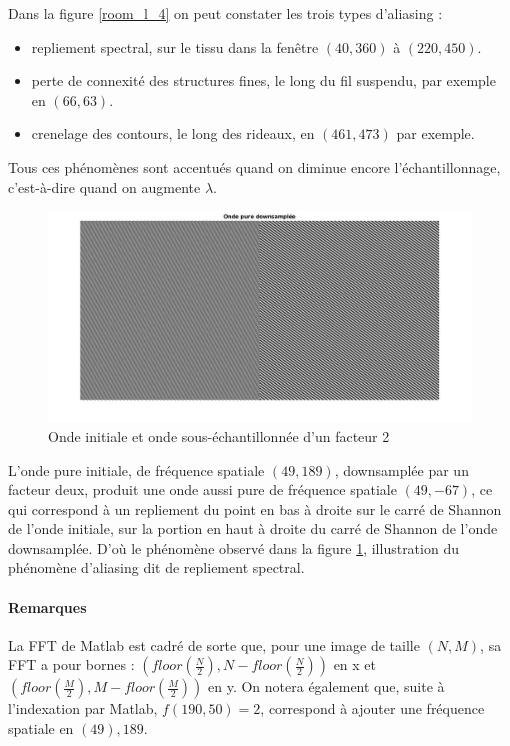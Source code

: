 \documentclass[12pt,a4paper,onecolumn]{article}
\begin{document}
Dans la figure \ref{room_l_4} on peut constater les trois types d'aliasing :
\begin{itemize}
	\item repliement spectral, sur le tissu dans la fenêtre $(40, 360)$ à $(220, 450)$.
	\item perte de connexité des structures fines, le long du fil suspendu, par exemple en $(66, 63)$.
	\item crenelage des contours, le long des rideaux, en $(461, 473)$ par exemple.
\end{itemize}
Tous ces phénomènes sont accentués quand on diminue encore l'échantillonnage, c'est-à-dire quand on augmente $\lambda$.

\begin{figure}[H]
	\begin{center}
		\includegraphics[width = \textwidth]{ex4_onde.jpg}
	\end{center}
	\caption{Onde initiale et onde sous-échantillonnée d'un facteur 2}
	\label{ex4_onde}
\end{figure}

L'onde pure initiale, de fréquence spatiale $(49, 189)$, downsamplée par un facteur deux, produit une onde aussi pure de fréquence spatiale $(49, -67)$, ce qui correspond à un repliement du point en bas à droite sur le carré de Shannon de l'onde initiale, sur la portion en haut à droite du carré de Shannon de l'onde downsamplée. D'où le phénomène observé dans la figure \ref{ex4_onde}, illustration du phénomène d'aliasing dit de repliement spectral.

\paragraph*{Remarques} La FFT de Matlab est cadré de sorte que, pour une image de taille $(N, M)$, sa FFT a pour bornes : $(floor(\frac{N}{2}), N - floor(\frac{N}{2}))$ en x et $(floor(\frac{M}{2}), M - floor(\frac{M}{2}))$ en y.
On notera également que, suite à l'indexation par Matlab, $f(190, 50) = 2$, correspond à ajouter une fréquence spatiale en $(49), 189$.
\end{document}
